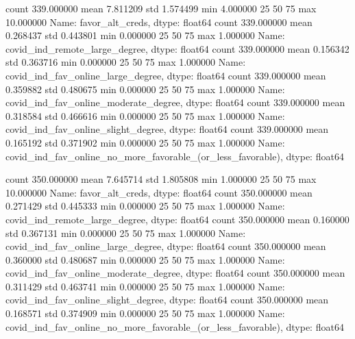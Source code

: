 
count    339.000000
mean       7.811209
std        1.574499
min        4.000000
25%
50%
75%
max       10.000000
Name: favor_alt_creds, dtype: float64
count    339.000000
mean       0.268437
std        0.443801
min        0.000000
25%
50%
75%
max        1.000000
Name: covid_ind_remote_large_degree, dtype: float64
count    339.000000
mean       0.156342
std        0.363716
min        0.000000
25%
50%
75%
max        1.000000
Name: covid_ind_fav_online_large_degree, dtype: float64
count    339.000000
mean       0.359882
std        0.480675
min        0.000000
25%
50%
75%
max        1.000000
Name: covid_ind_fav_online_moderate_degree, dtype: float64
count    339.000000
mean       0.318584
std        0.466616
min        0.000000
25%
50%
75%
max        1.000000
Name: covid_ind_fav_online_slight_degree, dtype: float64
count    339.000000
mean       0.165192
std        0.371902
min        0.000000
25%
50%
75%
max        1.000000
Name: covid_ind_fav_online_no_more_favorable_(or_less_favorable), dtype: float64




count    350.000000
mean       7.645714
std        1.805808
min        1.000000
25%
50%
75%
max       10.000000
Name: favor_alt_creds, dtype: float64
count    350.000000
mean       0.271429
std        0.445333
min        0.000000
25%
50%
75%
max        1.000000
Name: covid_ind_remote_large_degree, dtype: float64
count    350.000000
mean       0.160000
std        0.367131
min        0.000000
25%
50%
75%
max        1.000000
Name: covid_ind_fav_online_large_degree, dtype: float64
count    350.000000
mean       0.360000
std        0.480687
min        0.000000
25%
50%
75%
max        1.000000
Name: covid_ind_fav_online_moderate_degree, dtype: float64
count    350.000000
mean       0.311429
std        0.463741
min        0.000000
25%
50%
75%
max        1.000000
Name: covid_ind_fav_online_slight_degree, dtype: float64
count    350.000000
mean       0.168571
std        0.374909
min        0.000000
25%
50%
75%
max        1.000000
Name: covid_ind_fav_online_no_more_favorable_(or_less_favorable), dtype: float64

